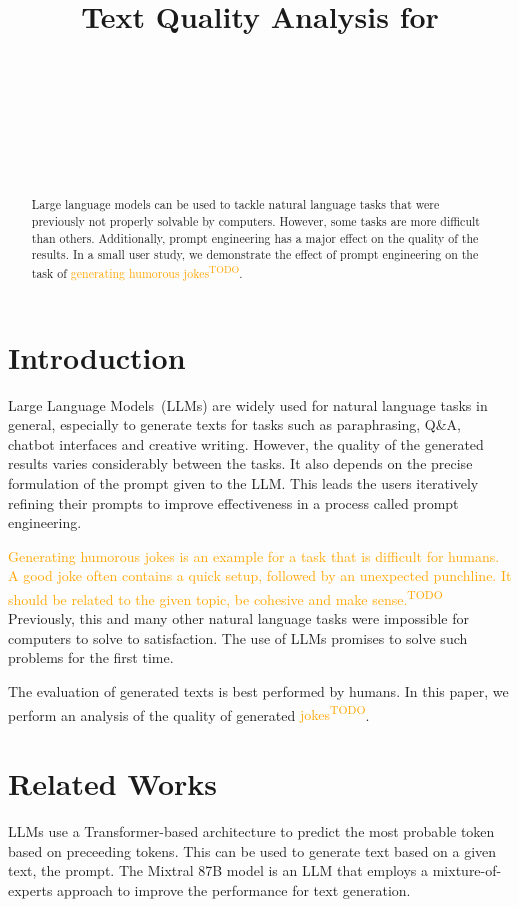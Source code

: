 \documentclass[11pt]{article}
\title{Text Quality Analysis for \todo{LLM-Generated Humor}}
\author{\todo{First Author}\\
  \todo{School (optional)} \\
  \todo{E-Mail (optional)} \\\And
  \todo{Second Author} \\
  \todo{School (optional)} \\
  \todo{E-Mail (optional)} \\
}
\newcommand{\todo}[1]{\textcolor{orange}{#1\textsuperscript{\footnotesize TODO}}}
\begin{document}
\maketitle
\begin{abstract}
Large language models can be used to tackle natural language tasks that were previously not properly solvable by computers.
However, some tasks are more difficult than others. Additionally, prompt engineering has a major effect on the quality of the results.
In a small user study, we demonstrate the effect of prompt engineering on the task of \todo{generating humorous jokes}.
\end{abstract}

\section{Introduction}

Large Language Models~(LLMs) are widely used for natural language tasks in general, especially to generate texts for tasks such as paraphrasing, Q\&A, chatbot interfaces and creative writing. However, the quality of the generated results varies considerably between the tasks. It also depends on the precise formulation of the prompt given to the LLM. This leads the users iteratively refining their prompts to improve effectiveness in a process called prompt engineering.

\todo{Generating humorous jokes is an example for a task that is difficult for humans. A good joke often contains a quick setup, followed by an unexpected punchline. It should be related to the given topic, be cohesive and make sense.} Previously, this and many other natural language tasks were impossible for computers to solve to satisfaction. The use of LLMs promises to solve such problems for the first time.

The evaluation of generated texts is best performed by humans. In this paper, we perform an analysis of the quality of generated \todo{jokes}.

\section{Related Works}

LLMs use a Transformer-based architecture \cite{vaswani2017} to predict the most probable token based on preceeding tokens. This can be used to generate text based on a given text, the prompt.
The Mixtral 8\texttimes 7B model \cite{jiang2024} is an LLM that employs a mixture-of-experts approach to improve the performance for text generation.
\end{document}
